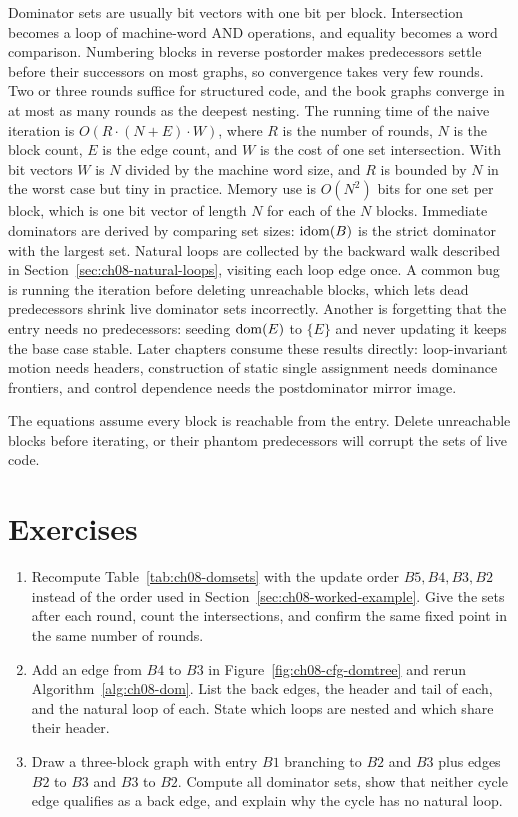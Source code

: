 Dominator sets are usually bit vectors with one bit per block.
Intersection becomes a loop of machine-word AND operations, and equality becomes a word comparison.
Numbering blocks in reverse postorder makes predecessors settle before their successors on most graphs, so convergence takes very few rounds.
Two or three rounds suffice for structured code, and the book graphs converge in at most as many rounds as the deepest nesting.
The running time of the naive iteration is $O(R \cdot (N + E) \cdot W)$, where $R$ is the number of rounds, $N$ is the block count, $E$ is the edge count, and $W$ is the cost of one set intersection.
With bit vectors $W$ is $N$ divided by the machine word size, and $R$ is bounded by $N$ in the worst case but tiny in practice.
Memory use is $O(N^2)$ bits for one set per block, which is one bit vector of length $N$ for each of the $N$ blocks.
Immediate dominators are derived by comparing set sizes: $\operatorname{idom}(B)$ is the strict dominator with the largest set.
Natural loops are collected by the backward walk described in Section~\ref{sec:ch08-natural-loops}, visiting each loop edge once.
A common bug is running the iteration before deleting unreachable blocks, which lets dead predecessors shrink live dominator sets incorrectly.
Another is forgetting that the entry needs no predecessors: seeding $\operatorname{dom}(E)$ to $\{E\}$ and never updating it keeps the base case stable.
Later chapters consume these results directly: loop-invariant motion needs headers, construction of static single assignment needs dominance frontiers, and control dependence needs the postdominator mirror image.
\begin{ccwarning}
The equations assume every block is reachable from the entry.
Delete unreachable blocks before iterating, or their phantom predecessors will corrupt the sets of live code.
\end{ccwarning}

\section{Exercises}
\label{sec:ch08-exercises}

\begin{enumerate}
\item \label{ex:ch08-recompute} Recompute Table~\ref{tab:ch08-domsets} with the update order $B5, B4, B3, B2$ instead of the order used in Section~\ref{sec:ch08-worked-example}. Give the sets after each round, count the intersections, and confirm the same fixed point in the same number of rounds.
\item \label{ex:ch08-find-loops} Add an edge from $B4$ to $B3$ in Figure~\ref{fig:ch08-cfg-domtree} and rerun Algorithm~\ref{alg:ch08-dom}. List the back edges, the header and tail of each, and the natural loop of each. State which loops are nested and which share their header.
\item \label{ex:ch08-irreducible} Draw a three-block graph with entry $B1$ branching to $B2$ and $B3$ plus edges $B2$ to $B3$ and $B3$ to $B2$. Compute all dominator sets, show that neither cycle edge qualifies as a back edge, and explain why the cycle has no natural loop.
\end{enumerate}

